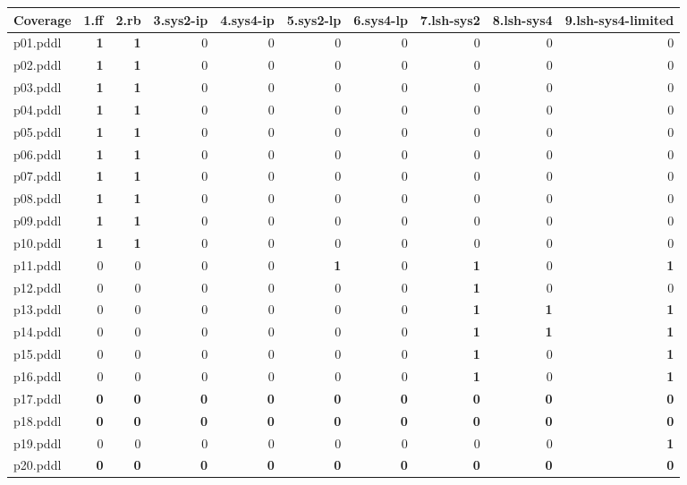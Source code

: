 \documentclass{article}
\begin{document}
\begin{tabular}{@{}lrrrrrrrrr@{}}
Coverage & 1.ff & 2.rb & 3.sys2-ip & 4.sys4-ip & 5.sys2-lp & 6.sys4-lp & 7.lsh-sys2 & 8.lsh-sys4 & 9.lsh-sys4-limited \\
\midrule
p01.pddl & \textbf{1} & \textbf{1} & 0 & 0 & 0 & 0 & 0 & 0 & 0 \\
p02.pddl & \textbf{1} & \textbf{1} & 0 & 0 & 0 & 0 & 0 & 0 & 0 \\
p03.pddl & \textbf{1} & \textbf{1} & 0 & 0 & 0 & 0 & 0 & 0 & 0 \\
p04.pddl & \textbf{1} & \textbf{1} & 0 & 0 & 0 & 0 & 0 & 0 & 0 \\
p05.pddl & \textbf{1} & \textbf{1} & 0 & 0 & 0 & 0 & 0 & 0 & 0 \\
p06.pddl & \textbf{1} & \textbf{1} & 0 & 0 & 0 & 0 & 0 & 0 & 0 \\
p07.pddl & \textbf{1} & \textbf{1} & 0 & 0 & 0 & 0 & 0 & 0 & 0 \\
p08.pddl & \textbf{1} & \textbf{1} & 0 & 0 & 0 & 0 & 0 & 0 & 0 \\
p09.pddl & \textbf{1} & \textbf{1} & 0 & 0 & 0 & 0 & 0 & 0 & 0 \\
p10.pddl & \textbf{1} & \textbf{1} & 0 & 0 & 0 & 0 & 0 & 0 & 0 \\
p11.pddl & 0 & 0 & 0 & 0 & \textbf{1} & 0 & \textbf{1} & 0 & \textbf{1} \\
p12.pddl & 0 & 0 & 0 & 0 & 0 & 0 & \textbf{1} & 0 & 0 \\
p13.pddl & 0 & 0 & 0 & 0 & 0 & 0 & \textbf{1} & \textbf{1} & \textbf{1} \\
p14.pddl & 0 & 0 & 0 & 0 & 0 & 0 & \textbf{1} & \textbf{1} & \textbf{1} \\
p15.pddl & 0 & 0 & 0 & 0 & 0 & 0 & \textbf{1} & 0 & \textbf{1} \\
p16.pddl & 0 & 0 & 0 & 0 & 0 & 0 & \textbf{1} & 0 & \textbf{1} \\
p17.pddl & \textbf{0} & \textbf{0} & \textbf{0} & \textbf{0} & \textbf{0} & \textbf{0} & \textbf{0} & \textbf{0} & \textbf{0} \\
p18.pddl & \textbf{0} & \textbf{0} & \textbf{0} & \textbf{0} & \textbf{0} & \textbf{0} & \textbf{0} & \textbf{0} & \textbf{0} \\
p19.pddl & 0 & 0 & 0 & 0 & 0 & 0 & 0 & 0 & \textbf{1} \\
p20.pddl & \textbf{0} & \textbf{0} & \textbf{0} & \textbf{0} & \textbf{0} & \textbf{0} & \textbf{0} & \textbf{0} & \textbf{0} \\
\end{tabular}
\end{document}
